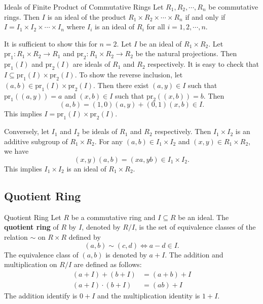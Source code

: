 \begin{proposition}{Ideals of Finite Product of Commutative Rings}{}
    Let $R_1, R_2, \cdots, R_n$ be commutative rings. Then $I$ is an ideal of the product $R_1\times R_2\times \cdots \times R_n$ if and only if $I=I_1\times I_2\times \cdots \times I_n$ where $I_i$ is an ideal of $R_i$ for all $i=1,2,\cdots,n$.
\end{proposition}
\begin{prf}
    It is sufficient to show this for $n=2$. Let $I$ be an ideal of $R_1\times R_2$. Let $\mathrm{pr}_1:R_1\times R_2\to R_1$ and $\mathrm{pr}_2:R_1\times R_2\to R_2$ be the natural projections. Then $\mathrm{pr}_1(I)$ and $\mathrm{pr}_2(I)$ are ideals of $R_1$ and $R_2$ respectively. It is easy to check that $I\subseteq \mathrm{pr}_1(I)\times \mathrm{pr}_2(I)$. To show the reverse inclusion, let $(a,b)\in \mathrm{pr}_1(I)\times \mathrm{pr}_2(I)$. Then there exist $(a,y)\in I$ such that $\mathrm{pr}_1((a,y))=a$ and $(x,b)\in I$ such that $\mathrm{pr}_2((x,b))=b$. Then 
    \[
    (a,b)=(1,0)(a,y)+(0,1)(x,b)\in I.
    \]
    This implies $I=\mathrm{pr}_1(I)\times \mathrm{pr}_2(I)$.

    Conversely, let $I_1$ and $I_2$ be ideals of $R_1$ and $R_2$ respectively. Then $I_1\times I_2$ is an additive subgroup of $R_1\times R_2$. For any $(a,b)\in I_1\times I_2$ and $(x,y)\in R_1\times R_2$, we have
    \[
    (x,y)(a,b)=(xa,yb)\in I_1\times I_2.
    \]
    This implies $I_1\times I_2$ is an ideal of $R_1\times R_2$.
\end{prf}


\subsection{Quotient Ring}
\begin{definition}{Quotient Ring}{}
    Let $R$ be a commutative ring and $I\subseteq R$ be an ideal. The \textbf{quotient ring} of $R$ by $I$, denoted by $R/I$, is the set of equivalence classes of the relation $\sim$ on $R\times R$ defined by $$(a,b)\sim (c,d)\iff a-d\in I.$$ The equivalence class of $(a,b)$ is denoted by $a+I$. The addition and multiplication on $R/I$ are defined as follows:
    \begin{align*}
        (a+I)+(b+I)&=(a+b)+I\\
        (a+I)\cdot(b+I)&=(ab)+I
    \end{align*}
    The addition identify is $0+I$ and the multiplication identity is $1+I$.
\end{definition}

